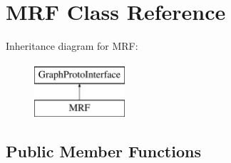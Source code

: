 \hypertarget{class_m_r_f}{
\section{MRF Class Reference}
\label{class_m_r_f}
}
Inheritance diagram for MRF:\begin{figure}[H]
\begin{center}
\leavevmode
\includegraphics[height=2cm]{class_m_r_f}
\end{center}
\end{figure}
\subsection*{Public Member Functions}
